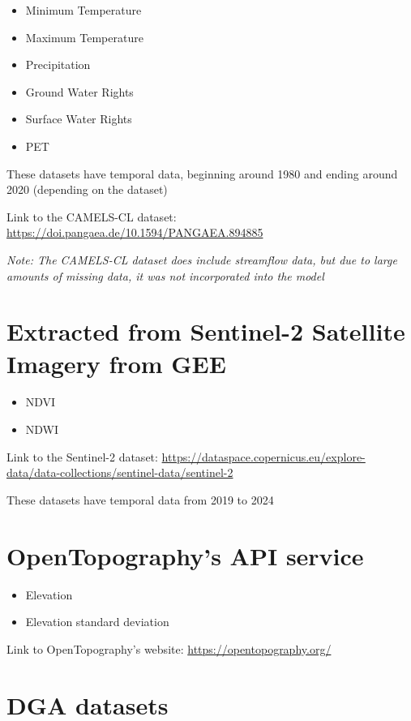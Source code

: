 \documentclass[
  letterpaper,
  DIV=11,
  numbers=noendperiod]{scrreprt}
\providecommand{\tightlist}{%
  \setlength{\itemsep}{0pt}\setlength{\parskip}{0pt}}
\begin{document}
\begin{itemize}
\tightlist
\item
  Minimum Temperature
\item
  Maximum Temperature
\item
  Precipitation
\item
  Ground Water Rights
\item
  Surface Water Rights
\item
  PET
\end{itemize}

These datasets have temporal data, beginning around 1980 and ending
around 2020 (depending on the dataset)

Link to the CAMELS-CL dataset:
\href{URL}{https://doi.pangaea.de/10.1594/PANGAEA.894885}

\emph{Note: The CAMELS-CL dataset does include streamflow data, but due
to large amounts of missing data, it was not incorporated into the
model}

\section{Extracted from Sentinel-2 Satellite Imagery from
GEE}\label{extracted-from-sentinel-2-satellite-imagery-from-gee}

\begin{itemize}
\tightlist
\item
  NDVI
\item
  NDWI
\end{itemize}

Link to the Sentinel-2 dataset:
\href{URL}{https://dataspace.copernicus.eu/explore-data/data-collections/sentinel-data/sentinel-2}

These datasets have temporal data from 2019 to 2024

\section{OpenTopography's API
service}\label{opentopographys-api-service}

\begin{itemize}
\tightlist
\item
  Elevation
\item
  Elevation standard deviation
\end{itemize}

Link to OpenTopography's website:
\href{URL}{https://opentopography.org/}

\section{DGA datasets}\label{dga-datasets}
\end{document}
